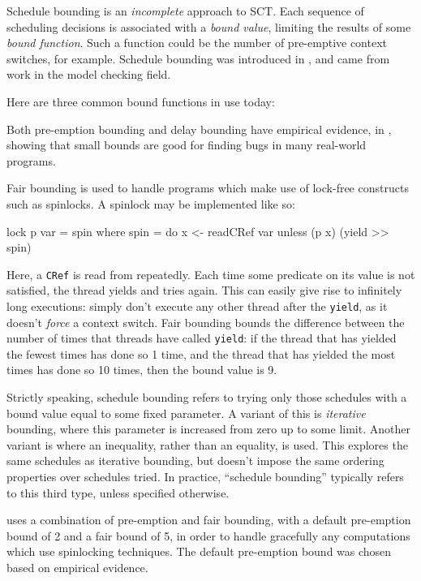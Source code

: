 Schedule bounding is an \emph{incomplete} approach to SCT. Each
sequence of scheduling decisions is associated with a \emph{bound
  value}, limiting the results of some \emph{bound function}. Such a
function could be the number of pre-emptive context switches, for
example. Schedule bounding was introduced in \citep{pbound}, and came
from work in the model checking field.

Here are three common bound functions in use today:




Both pre-emption bounding and delay bounding have empirical evidence,
in \citep{empirical}, showing that small bounds are good for finding
bugs in many real-world programs.

Fair bounding is used to handle programs which make use of lock-free
constructs such as spinlocks. A spinlock may be implemented like so:

\begin{haskellcode}
lock p var = spin where
  spin = do
    x <- readCRef var
    unless (p x) (yield >> spin)
\end{haskellcode}

Here, a \verb|CRef| is read from repeatedly. Each time some predicate on its value
is not satisfied, the thread yields and tries again. This can easily
give rise to infinitely long executions: simply don't execute any
other thread after the \verb|yield|, as it doesn't \emph{force} a
context switch. Fair bounding bounds the difference between the number
of times that threads have called \verb|yield|: if the thread that has
yielded the fewest times has done so 1 time, and the thread that has
yielded the most times has done so 10 times, then the bound value is
9.

Strictly speaking, schedule bounding refers to trying only those
schedules with a bound value equal to some fixed parameter. A variant
of this is \emph{iterative} bounding, where this parameter is
increased from zero up to some limit. Another variant is where an
inequality, rather than an equality, is used. This explores the same
schedules as iterative bounding, but doesn't impose the same ordering
properties over schedules tried. In practice, ``schedule bounding''
typically refers to this third type, unless specified otherwise.

\dejafu{} uses a combination of pre-emption and fair bounding, with a
default pre-emption bound of 2 and a fair bound of 5, in order to
handle gracefully any computations which use spinlocking
techniques. The default pre-emption bound was chosen based on
empirical evidence.
